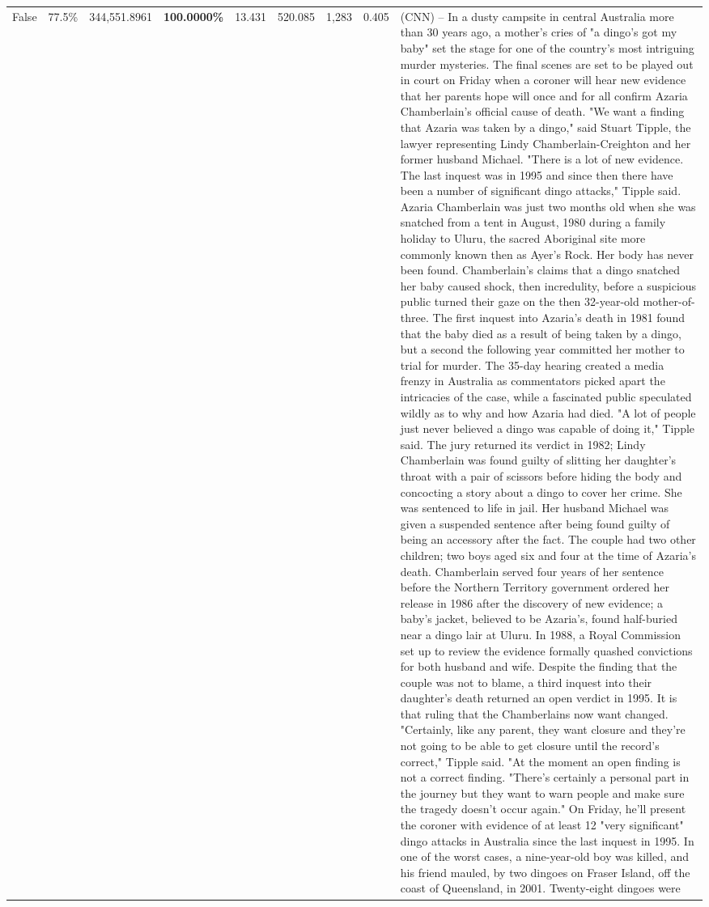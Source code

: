 \begin{table}[H]
\begin{tabular}{lllrlllll}
False & 77.5\% & 344,551.8961 & \bfseries \color{red} 100.0000\% & 13.431 & 520.085 & 1,283 & 0.405 & (CNN) -- In a dusty campsite in central Australia more than 30 years ago, a mother's cries of "a dingo's got my baby" set the stage for one of the country's most intriguing murder mysteries. The final scenes are set to be played out in court on Friday when a coroner will hear new evidence that her parents hope will once and for all confirm Azaria Chamberlain's official cause of death. "We want a finding that Azaria was taken by a dingo," said Stuart Tipple, the lawyer representing Lindy Chamberlain-Creighton and her former husband Michael. "There is a lot of new evidence. The last inquest was in 1995 and since then there have been a number of significant dingo attacks," Tipple said. Azaria Chamberlain was just two months old when she was snatched from a tent in August, 1980 during a family holiday to Uluru, the sacred Aboriginal site more commonly known then as Ayer's Rock. Her body has never been found. Chamberlain's claims that a dingo snatched her baby caused shock, then incredulity, before a suspicious public turned their gaze on the then 32-year-old mother-of-three. The first inquest into Azaria's death in 1981 found that the baby died as a result of being taken by a dingo, but a second the following year committed her mother to trial for murder. The 35-day hearing created a media frenzy in Australia as commentators picked apart the intricacies of the case, while a fascinated public speculated wildly as to why and how Azaria had died. "A lot of people just never believed a dingo was capable of doing it," Tipple said. The jury returned its verdict in 1982; Lindy Chamberlain was found guilty of slitting her daughter's throat with a pair of scissors before hiding the body and concocting a story about a dingo to cover her crime. She was sentenced to life in jail. Her husband Michael was given a suspended sentence after being found guilty of being an accessory after the fact. The couple had two other children; two boys aged six and four at the time of Azaria's death. Chamberlain served four years of her sentence before the Northern Territory government ordered her release in 1986 after the discovery of new evidence; a baby's jacket, believed to be Azaria's, found half-buried near a dingo lair at Uluru. In 1988, a Royal Commission set up to review the evidence formally quashed convictions for both husband and wife. Despite the finding that the couple was not to blame, a third inquest into their daughter's death returned an open verdict in 1995. It is that ruling that the Chamberlains now want changed. "Certainly, like any parent, they want closure and they're not going to be able to get closure until the record's correct," Tipple said. "At the moment an open finding is not a correct finding. "There's certainly a personal part in the journey but they want to warn people and make sure the tragedy doesn't occur again." On Friday, he'll present the coroner with evidence of at least 12 "very significant" dingo attacks in Australia since the last inquest in 1995. In one of the worst cases, a nine-year-old boy was killed, and his friend mauled, by two dingoes on Fraser Island, off the coast of Queensland, in 2001. Twenty-eight dingoes were 
\end{tabular}
\end{table}
